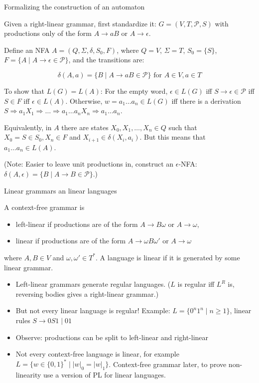 \documentclass[handout]{beamer}
\begin{document}
\begin{frame}{Formalizing the construction of an automaton}

	Given a right-linear grammar, first standardize it: $G=(V,T,\mathcal P,S)$ with productions only of the form $A\rightarrow aB$ or $A\rightarrow \epsilon$.
	
	Define an NFA $A=(Q,\Sigma,\delta,S_0,F)$, where $Q=V$, $\Sigma=T$, $S_0=\{S\}$, $F=\{A\mid A\rightarrow\epsilon\in\mathcal P\}$, and the transitions are:
	
	\vspace{-15pt}
	$$
	\delta(A,a)=\{B\mid A\rightarrow aB\in\mathcal P\}\text{ for }A\in V,a\in T
	$$
	\vspace{-21pt}
	
	To show that $L(G)=L(A)$: For the empty word, $\epsilon\in L(G)$ iff $S\rightarrow \epsilon\in\mathcal P$ iff $S \in F$ iff $\epsilon \in L(A)$. Otherwise, $w=a_1\dots a_n\in L(G)$ iff there is a derivation $S\Rightarrow a_1 X_1 \Rightarrow \dots \Rightarrow a_1\dots a_n X_n\Rightarrow a_1\dots a_n$.

	Equivalently, in $A$ there are states $X_0,X_1,\dots, X_n\in Q$ such that $X_0=S\in S_0, X_n\in F$ and $X_{i+1}\in \delta(X_i, a_i)$. But this means that $a_1\dots a_n\in L(A)$.\hfill\qedsymbol

	\vspace{-3pt}
	(Note: Easier to leave unit productions in, construct an $\epsilon$-NFA: $\delta(A,\epsilon)=\{B\mid A\rightarrow B\in\mathcal P\}$.)

\end{frame}


\begin{frame}{Linear grammars an linear languages}

	A context-free grammar is
	\begin{itemize}
		\item \alert{left-linear} if productions are of the form $A\rightarrow B\omega$ or $A\rightarrow\omega$,
		\item \alert{linear} if productions are of the form $A\rightarrow \omega B\omega'$ or $A\rightarrow\omega$
	\end{itemize}
	where $A,B\in V$ and $\omega,\omega'\in T^*$. A language is \alert{linear} if it is generated by some linear grammar.

	\begin{itemize}
		\item Left-linear grammars generate regular languages. ($L$ is regular iff $L^R$ is, reversing bodies gives a right-linear grammar.)
		\item But not every linear language is regular! Example: $L=\{0^n1^n\mid n\geq 1\}$, linear rules $S\rightarrow 0S1\mid 01$
		\item Observe: productions can be split to left-linear and right-linear
		\item Not every context-free language is linear, for example $L=\{w\in\{0,1\}^*\mid |w|_0=|w|_1\}$. Context-free grammar later, to prove non-linearity use a version of PL for linear languages.
	\end{itemize}

\end{frame}
\end{document}
